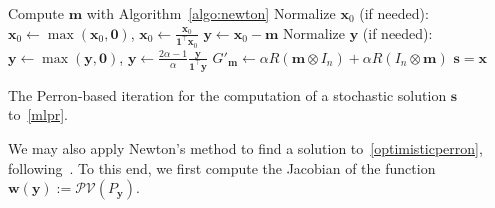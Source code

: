 \documentclass[10pt]{paper}
\DeclarePairedDelimiter{\norm}{\lVert}{\rVert}
\begin{document}
\begin{algorithm}
Compute ${\mathbf{m}}$ with Algorithm~\ref{algo:newton}\;
Normalize ${\mathbf{x}}_0$ (if needed): ${\mathbf{x}}_0 \leftarrow \max({\mathbf{x}}_0,\mathbf{0})$, ${\mathbf{x}}_0 \leftarrow \frac{{\mathbf{x}}_0}{{\mathbf{1}}^\top {\mathbf{x}}_0}$\;
${\mathbf{y}} \leftarrow {\mathbf{x}}_0 - {\mathbf{m}}$\;
Normalize ${\mathbf{y}}$ (if needed): ${\mathbf{y}} \leftarrow \max({\mathbf{y}},\mathbf{0})$, ${\mathbf{y}} \leftarrow \frac{2\alpha-1}{\alpha} \frac{\mathbf{y}}{{\mathbf{1}}^\top {\mathbf{y}}}$\;
$G'_{\mathbf{m}} \leftarrow  \alpha R({\mathbf{m}} \otimes I_n) + \alpha R(I_n \otimes {\mathbf{m}})$\;
${\mathbf{s}} = {\mathbf{x}}$\;
\caption{The Perron-based iteration for the computation of a stochastic solution ${\mathbf{s}}$ to~\eqref{mlpr}.} \label{algo:perron}
\end{algorithm}

We may also apply Newton's method to find a solution to~\eqref{optimisticperron}, following~\cite{BinMP11}. 
To this end, we first compute the Jacobian of the function ${\mathbf{w}}({\mathbf{y}}):=\mathcal{PV}(P_{\mathbf{y}})$.
\end{document}
